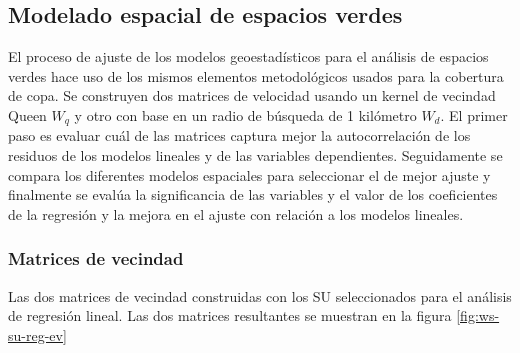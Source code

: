 \documentclass[12pt,]{book}
\begin{document}
\subsection{Modelado espacial de espacios
verdes}\label{modelado-espacial-de-espacios-verdes}

El proceso de ajuste de los modelos geoestadísticos para el análisis de
espacios verdes hace uso de los mismos elementos metodológicos usados
para la cobertura de copa. Se construyen dos matrices de velocidad
usando un kernel de vecindad Queen \(W_q\) y otro con base en un radio
de búsqueda de 1 kilómetro \(W_d\). El primer paso es evaluar cuál de
las matrices captura mejor la autocorrelación de los residuos de los
modelos lineales y de las variables dependientes. Seguidamente se
compara los diferentes modelos espaciales para seleccionar el de mejor
ajuste y finalmente se evalúa la significancia de las variables y el
valor de los coeficientes de la regresión y la mejora en el ajuste con
relación a los modelos lineales.

\subsubsection{Matrices de vecindad}\label{matrices-de-vecindad-1}

Las dos matrices de vecindad construidas con los SU seleccionados para
el análisis de regresión lineal. Las dos matrices resultantes se
muestran en la figura \ref{fig:ws-su-reg-ev}
\end{document}
